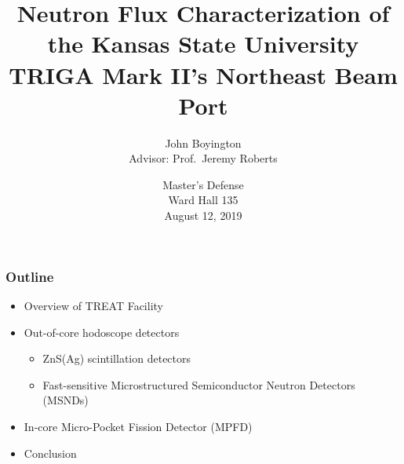\documentclass[fleqn]{beamer}
\title[KSU Beam Characterization]{Neutron Flux Characterization of the Kansas State University TRIGA Mark II's Northeast Beam Port}
\author[John Boyington]{
    John Boyington\\
    Advisor: Prof.~Jeremy Roberts}
\institute[Kansas State University]{
    Department of Mechanical and Nuclear Engineering \\
    Kansas State University}
\date[Master's Defense]{
    Master's Defense\\
    Ward Hall 135\\
    August 12, 2019}
\begin{document}
    \newcommand{\beginbackup}{
        \newcounter{framenumbervorappendix}
        \setcounter{framenumbervorappendix}{\value{framenumber}}
    }
    \newcommand{\backupend}{
        \addtocounter{framenumbervorappendix}{-\value{framenumber}}
        \addtocounter{framenumber}{\value{framenumbervorappendix}}
    }
    
    \begin{frame}
        \titlepage
    \end{frame}

    \begin{frame}
     \frametitle{Outline}
      \begin{itemize}
       \item Overview of TREAT Facility
       \item Out-of-core hodoscope detectors
       
       \begin{itemize}
        \item ZnS(Ag) scintillation detectors
        \item Fast-sensitive Microstructured Semiconductor Neutron Detectors (MSNDs)
       \end{itemize}
       \item In-core Micro-Pocket Fission Detector (MPFD)
       \item Conclusion
      \end{itemize}
    \end{frame}
\end{document}
